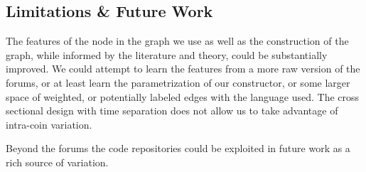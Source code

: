 \subsection{Limitations \& Future Work}

The features of the node in the graph we use as well as the construction of the graph, while informed by the literature and theory, could be substantially improved.
We could attempt to learn the features from a more raw version of the forums, or at least learn the parametrization of our constructor, or some larger space of weighted, or potentially labeled edges with the language used.
The cross sectional design with time separation does not allow us to take advantage of intra-coin variation.

Beyond the forums the code repositories could be exploited in future work as a rich source of variation.
